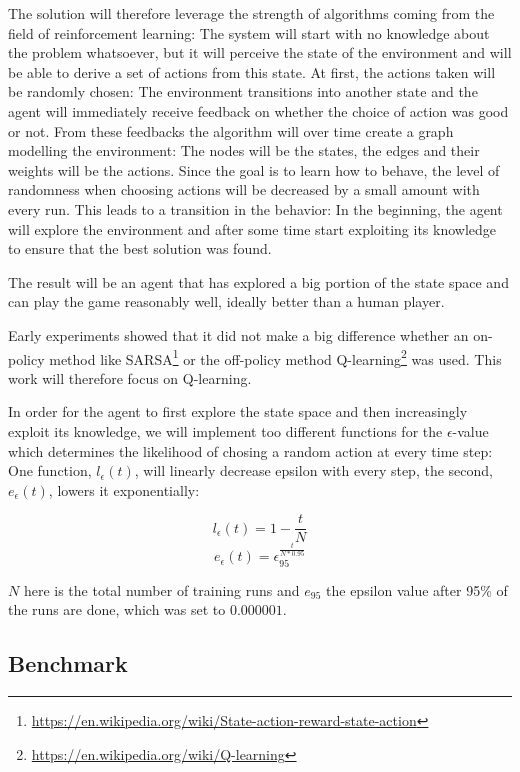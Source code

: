 \documentclass[a4paper,10pt]{article}
\begin{document}
The solution will therefore leverage the strength of algorithms coming from the field of reinforcement learning:
The system will start with no knowledge about the problem whatsoever, but it will perceive the state of the environment and will be able to derive a set of actions from this state.
At first, the actions taken will be randomly chosen: 
The environment transitions into another state and the agent will immediately receive feedback on whether the choice of action was good or not.
From these feedbacks the algorithm will over time create a graph modelling the environment:
The nodes will be the states, the edges and their weights will be the actions.
Since the goal is to learn how to behave, the level of randomness when choosing actions will be decreased by a small amount with every run.
This leads to a transition in the behavior: In the beginning, the agent will explore the environment and after some time start exploiting its knowledge to ensure that the best solution was found.

The result will be an agent that has explored a big portion of the state space and can play the game reasonably well, ideally better than a human player.

Early experiments showed that it did not make a big difference whether an on-policy method like SARSA\footnote{\url{https://en.wikipedia.org/wiki/State-action-reward-state-action}} or the off-policy method Q-learning\footnote{\url{https://en.wikipedia.org/wiki/Q-learning}} was used.
This work will therefore focus on Q-learning.

In order for the agent to first explore the state space and then increasingly exploit its knowledge, we will implement too different functions for the $\epsilon$-value which determines the likelihood of chosing a random action at every time step:
One function, $l_\epsilon(t)$, will linearly decrease epsilon with every step, the second, $e_\epsilon(t)$, lowers it exponentially:

\[l_\epsilon(t) = 1 - \frac{t}{N}\]
\[e_\epsilon(t) = \epsilon_{95}^\frac{t}{N*0.95}\]

$N$ here is the total number of training runs and $e_{95}$ the epsilon value after 95\% of the runs are done, which was set to $0.000001$.

\subsection{Benchmark}
\end{document}
